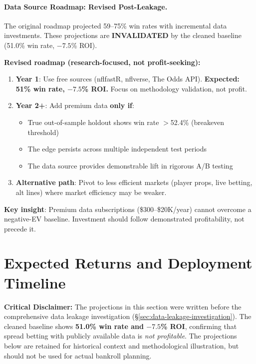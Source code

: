 \paragraph{Data Source Roadmap: Revised Post-Leakage.}
The original roadmap projected 59--75\% win rates with incremental data investments. These projections are \textbf{INVALIDATED} by the cleaned baseline (51.0\% win rate, $-7.5$\% ROI).

\textbf{Revised roadmap (research-focused, not profit-seeking):}
\begin{enumerate}
\item \textbf{Year 1}: Use free sources (nflfastR, nflverse, The Odds API). \textbf{Expected: 51\% win rate, $-7.5$\% ROI.} Focus on methodology validation, not profit.
\item \textbf{Year 2+}: Add premium data \textbf{only if}:
  \begin{itemize}
    \item True out-of-sample holdout shows win rate $>$52.4\% (breakeven threshold)
    \item The edge persists across multiple independent test periods
    \item The data source provides demonstrable lift in rigorous A/B testing
  \end{itemize}
\item \textbf{Alternative path}: Pivot to less efficient markets (player props, live betting, alt lines) where market efficiency may be weaker.
\end{enumerate}

\textbf{Key insight}: Premium data subscriptions (\$300--\$20K/year) cannot overcome a negative-EV baseline. Investment should follow demonstrated profitability, not precede it.

\section{Expected Returns and Deployment Timeline}
\label{sec:expected_returns}

\textbf{Critical Disclaimer:} The projections in this section were written before the comprehensive data leakage investigation (\S\ref{sec:data-leakage-investigation}). The cleaned baseline shows \textbf{51.0\% win rate and $-7.5$\% ROI}, confirming that spread betting with publicly available data is \emph{not profitable}. The projections below are retained for historical context and methodological illustration, but should not be used for actual bankroll planning.

